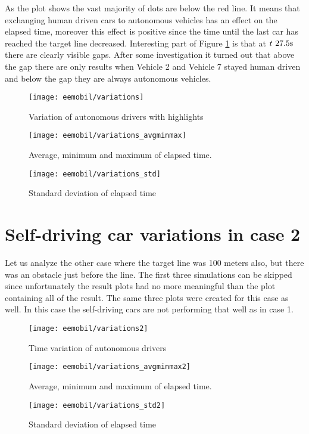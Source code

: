 		As the plot shows the vast majority of dots are below the red line. It means that exchanging human driven cars to autonomous vehicles has an effect on the  elapsed time, moreover this effect is positive since the time until the last car has reached the target line decreased. Interesting part of Figure \ref{fig:self_variations} is that at $t~27.5\rm s$ there are clearly visible gaps. After some investigation it turned out that above the gap there are only results when Vehicle 2 and Vehicle 7 stayed human driven and below the gap they are always autonomous vehicles.
		\begin{figure}
			\centering
			\texttt{[image: eemobil/variations]}
			\caption{Variation of autonomous drivers with highlights}
			\label{fig:self_variations}
		\end{figure}
		\begin{figure}
			\centering
			\texttt{[image: eemobil/variations\_avgminmax]}
			\caption{Average, minimum and maximum of elapsed time.}
			\label{fig:self_variations_avgminmax}
		\end{figure}
		
		\begin{figure}
			\centering
			\texttt{[image: eemobil/variations\_std]}
			\caption{Standard deviation of elapsed time}
			\label{fig:self_variations_std}
		\end{figure}
	\section{Self-driving car variations in case 2}
		Let us analyze the other case where the target line was 100 meters also, but there was an obstacle just before the line. The first three simulations can be skipped since unfortunately the result plots had no more meaningful than the plot containing all of the result. The same three plots were created for this case as well. In this case the self-driving cars are not performing that well as in case 1. \cite{matlabFFT}
		\begin{figure}
			\centering
			\texttt{[image: eemobil/variations2]}
			\caption{Time variation of autonomous drivers}
			\label{fig:self_variations2}
		\end{figure}
		\begin{figure}
			\centering
			\texttt{[image: eemobil/variations\_avgminmax2]}
			\caption{Average, minimum and maximum of elapsed time.}
			\label{fig:self_variations_avgminmax2}
		\end{figure}
		\begin{figure}
			\centering
			\texttt{[image: eemobil/variations\_std2]}
			\caption{Standard deviation of elapsed time}
			\label{fig:self_variations_std2}
		\end{figure}
